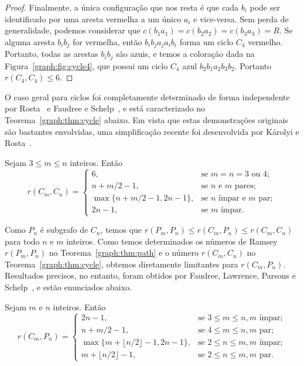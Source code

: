 \begin{proof}
Finalmente, a única configuração que nos resta é que cada $b_i$ pode ser identificado por uma aresta vermelha a um único $a_i$ e vice-versa. Sem perda de generalidade, podemos considerar que $c(b_1 a_1) = c(b_2 a_2) = c(b_3 a_3) = R$. Se alguma aresta $b_i b_j$ for vermelha, então $b_i b_j a_j a_i b_i$ forma um ciclo $C_4$ vermelho. Portanto, todas as arestas $b_i b_j$ são azuis, e temos a coloração dada na Figura~\ref{graph:fig:cycle4}, que possui um ciclo $C_4$ azul $b_2 b_1 a_2 b_3 b_2$. Portanto $r(C_4,C_4) \leq 6$.
\end{proof}

O caso geral para ciclos foi completamente determinado de forma independente por Rosta~\cite{rosta1973ramsey} e Faudree e Schelp~\cite{faudree1974all}, e está caracterizado no Teorema~\ref{graph:thm:cycle} abaixo. Em vista que estas demonstrações originais são bastantes envolvidas, uma simplificação recente foi desenvolvida por Károlyi e Rosta~\cite{karolyi2001generalized}.

\begin{theorem}
\label{graph:thm:cycle}
Sejam $3 \leq m \leq n$ inteiros. Então
\[r(C_m, C_n) = \begin{cases}
  6, & \text{se }m = n = 3 \text{ ou } 4;\\
  n + m/2 - 1, & \text{se }  n \text{ e } m \text{ pares}; \\
  \max\{n + m/2 - 1, 2n - 1\}, & \text{se } n \text{ ímpar e } m \text{ par};\\
  2n - 1 , & \text{se } m \text{ ímpar}.
\end{cases}\]
\end{theorem}

Como $P_n$ é subgrafo de $C_n$, temos que $r(P_m, P_n) \leq r(C_m, P_n) \leq r(C_m, C_n)$ para todo $n$ e $m$ inteiros. Como temos determinados os números de Ramsey $r(P_m, P_n)$ no Teorema~\ref{graph:thm:path} e o número $r(C_m, C_n)$ no Teorema~\ref{graph:thm:cycle}, obtemos diretamente limitantes para $r(C_m, P_n)$. Resultados precisos, no entanto, foram obtidos por Faudree, Lawrence, Parsons e Schelp~\cite{faudree1974path}, e estão enunciados abaixo.

\begin{theorem}
\label{graph:thm:pathcycle}
Sejam $m$ e $n$ inteiros. Então
\[r(C_m, P_n) = \begin{cases}
  2n - 1, & \text{se }3 \leq m \leq n, m \text{ ímpar};\\
  n + m/2 - 1, & \text{se }4 \leq m \leq n, m \text{ par}; \\
  \max\{m + \lfloor n/2 \rfloor - 1, 2n - 1\}, & \text{se } 2 \leq n \leq m, m \text{ ímpar};\\
  m + \lfloor n/2 \rfloor -1 , & \text{se } 2 \leq n \leq m, m \text{ par}.
\end{cases}\]
\end{theorem}

